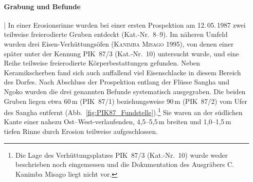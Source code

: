 \paragraph{Grabung und Befunde}\hspace{-.5em}|\hspace{.5em}%
In einer Erosionsrinne wurden bei einer ersten Prospektion am 12.\,05.\,1987 zwei teilweise freierodierte Gruben entdeckt (Kat.-Nr.~8--9). Im näheren Umfeld wurden drei Eisen-Verhüttungsöfen (\textsc{Kanimba Misago} 1995), von denen einer später unter der Kennung PIK~87/3 (Kat.-Nr.~10) untersucht wurde, und eine Reihe teilweise freierodierte Körperbestattungen gefunden. Neben Keramikscherben fand sich auch auffallend viel Eisenschlacke in diesem Bereich des Dorfes. Nach Abschluss der Prospektion entlang der Flüsse \mbox{Sangha} und \mbox{Ngoko} wurden die drei genannten Befunde systematisch ausgegraben. Die beiden Gruben liegen etwa 60\,m (PIK~87/1) beziehungsweise 90\,m (PIK~87/2) vom Ufer des \mbox{Sangha} entfernt (Abb.~\ref{fig:PIK87_Fundstelle}).\footnote{Die Lage des Verhüttungsplatzes PIK~87/3 (Kat.-Nr.~10) wurde weder beschrieben noch eingemessen und die Dokumentation des Ausgräbers C. Kanimba Misago liegt nicht vor.} Sie waren an der südlichen Kante einer nahezu Ost--West-verlaufenden, 4,5--5,5\,m breiten und 1,0--1,5\,m tiefen Rinne durch Erosion teilweise aufgeschlossen.

